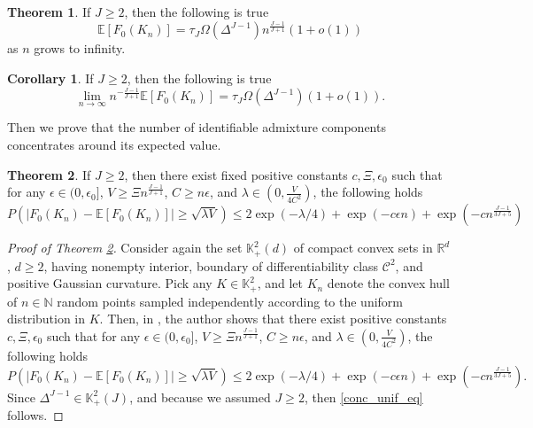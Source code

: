 \documentclass[12pt, reqno]{amsart}
\theoremstyle{definition}
\newtheorem{theorem}{Theorem}%
\newtheorem{corollary}{Corollary}[theorem]
\begin{document}
\begin{theorem}\label{exp_pois}
If $J\geq 2$, then the following is true
\begin{equation}\label{exp_pois_eq}
    \mathbb{E}[F_0(K_n)] = \tau_J \Omega(\Delta^{J-1})n^{\frac{J-1}{J+1}}\left(1+o(1)\right)
\end{equation}
as $n$ grows to infinity.
\end{theorem}

\begin{corollary}\label{exp_pois_growth}
If $J\geq 2$, then the following is true
$$\lim_{n\rightarrow\infty} n^{-\frac{J-1}{J+1}}\mathbb{E}[F_0(K_n)] = \tau_J \Omega(\Delta^{J-1})\left(1+o(1)\right).$$
\end{corollary}

Then we prove that the number of identifiable admixture components concentrates around its expected value. 


\begin{theorem}\label{conc_unif_thm}
    If $J\geq 2$, then there exist fixed positive constants $c,\Xi,\epsilon_0$ such that for any $\epsilon\in(0,\epsilon_0]$, $V\geq \Xi n^{\frac{J-1}{J+1}}$, $C\geq n\epsilon$, and $\lambda\in(0,\frac{V}{4C^2})$, the following holds
    \begin{equation}\label{conc_unif_eq}
        P\left( \left| F_0(K_n) -\mathbb{E}[F_0(K_n)] \right| \geq \sqrt{\lambda V} \right) \leq 2 \exp(-\lambda/4)+\exp(-c\epsilon n) + \exp\left(-cn^\frac{J-1}{3J+5}\right)
    \end{equation}
\end{theorem}



\begin{proof}[Proof of Theorem \ref{conc_unif_thm}]
    Consider again the set $\mathbb{K}^2_+(d)$ of compact convex sets in $\mathbb{R}^d$, $d \geq 2$, having nonempty interior, boundary of differentiability class $\mathcal{C}^2$, and positive Gaussian curvature. Pick any $K \in \mathbb{K}^2_+$, and let $K_n$ denote the convex hull of $n\in\mathbb{N}$ random points sampled independently according to the uniform distribution in $K$. 
Then, in \cite[Theorem 2.11]{vu}, the author shows that
there exist positive constants $c,\Xi,\epsilon_0$ such that for any $\epsilon\in(0,\epsilon_0]$, $V\geq \Xi n^{\frac{J-1}{J+1}}$, $C\geq n\epsilon$, and $\lambda\in(0,\frac{V}{4C^2})$, the following holds
        $$P\left( \left| F_0(K_n) -\mathbb{E}[F_0(K_n)] \right| \geq \sqrt{\lambda V} \right) \leq 2 \exp(-\lambda/4)+\exp(-c\epsilon n) + \exp\left(-cn^\frac{J-1}{3J+5}\right).$$
        Since $\Delta^{J-1}\in \mathbb{K}_+^2(J)$, and because we assumed $J\geq 2$, then \eqref{conc_unif_eq} follows.
\end{proof}
\end{document}
